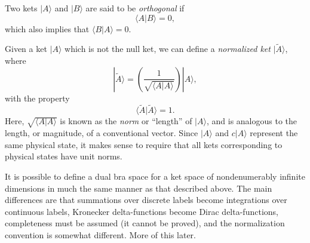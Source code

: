 Two kets $|A\rangle$ and $|B \rangle$ are said to be {\em orthogonal}
if 
\begin{equation}
\langle A|B \rangle = 0,
\end{equation}
which also implies that $\langle B|A \rangle=0$.

Given a ket $|A\rangle$ which is not the null ket,
 we can define a {\em normalized ket} $|\tilde{A}\rangle$, where
\begin{equation}
|\tilde{A}\rangle = \left(\frac{1}{\sqrt{\langle A|A \rangle }}\right)|A\rangle,
\end{equation}
with the property
\begin{equation}
\langle \tilde{A}|\tilde{A} \rangle = 1.
\end{equation}
Here, $\sqrt{\langle A|A \rangle }$ is known as the {\em norm} 
or ``length'' of $|A\rangle$, and
is analogous to the length, or magnitude,  of a conventional vector. Since
$|A\rangle$ and $c |A\rangle$ represent the same physical state, it makes sense
to require that all kets corresponding to  physical states have unit norms. 

It is possible to define a dual bra space for a ket space of nondenumerably
infinite dimensions in much the same manner as that described above. The
main differences are that summations over discrete labels become integrations
over continuous labels, Kronecker delta-functions become Dirac delta-functions, 
completeness must be assumed (it cannot be proved), and the normalization convention 
is somewhat different. More of this later. 

